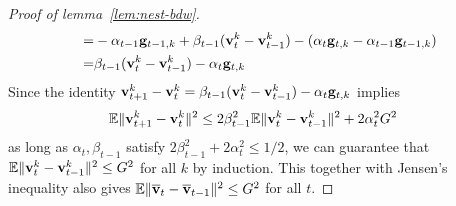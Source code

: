 \begin{proof}[Proof of lemma~\ref{lem:nest-bdw}]
\begin{align*}
=&-\alpha_{t-1}{\mathbf{g}}_{t-1,k}+\beta_{t-1}({\mathbf{v}}_{t}^{k}-{\mathbf{v}}_{t-1}^{k})-(\alpha_{t}{\mathbf{g}}_{t,k}-\alpha_{t-1}{\mathbf{g}}_{t-1,k})\\
=&\beta_{t-1}({\mathbf{v}}_{t}^{k}-{\mathbf{v}}_{t-1}^{k})-\alpha_{t}{\mathbf{g}}_{t,k}
\end{align*}
Since the identity ${\mathbf{v}}_{t+1}^{k}-{\mathbf{v}}_{t}^{k}=\beta_{t-1}({\mathbf{v}}_{t}^{k}-{\mathbf{v}}_{t-1}^{k})-\alpha_{t}{\mathbf{g}}_{t,k}$
implies 
\begin{align*}
\mathbb{E}\|{\mathbf{v}}_{t+1}^{k}-{\mathbf{v}}_{t}^{k}\|^{2} & \leq2\beta_{t-1}^{2}\mathbb{E}\|{\mathbf{v}}_{t}^{k}-{\mathbf{v}}_{t-1}^{k}\|^{2}+2\alpha_{t}^{2}G^{2}
\end{align*}
as long as $\alpha_{t},\beta_{t-1}$ satisfy $2\beta_{t-1}^{2}+2\alpha_{t}^{2}\leq1/2$,
we can guarantee that $\mathbb{E}\|{\mathbf{v}}_{t}^{k}-{\mathbf{v}}_{t-1}^{k}\|^{2}\leq G^{2}$
for all $k$ by induction. This together with Jensen's inequality
also gives $\mathbb{E}\|{\overline{\mathbf{v}}}_{t}-{\overline{\mathbf{v}}}_{t-1}\|^{2}\leq G^{2}$
for all $t$. 
\end{proof}

